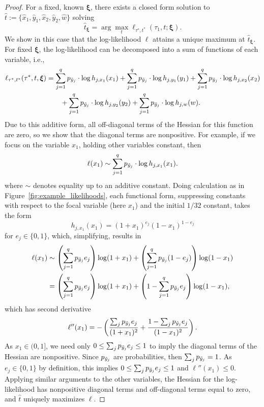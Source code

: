 \begin{proof}
For a fixed, known $\boldsymbol\xi$, there exists a closed form solution to $\hat{t} := \{\hat{x}_1,\hat{y}_1,\hat{x}_2,\hat{y}_2,\hat{w}\}$ solving
\[
\hat{t}_{\boldsymbol\xi} = \arg\max_t \ell_{\tau^*, t^*}(\tau_1, t; \boldsymbol\xi).
\]
We show in this case that the log-likelihood $\ell$ attains a unique maximum at $\hat{t}_{\boldsymbol\xi}$.
For fixed $\boldsymbol\xi$, the log-likelihood can be decomposed into a sum of functions of each variable, i.e.,
\begin{align*}
\ell_{\tau^*,t^*}(\tau^*, t, \boldsymbol\xi) &= \sum_{j=1}^q p_{\tilde{y}_j}\cdot\log h_{j,x_1}(x_1)+\sum_{j=1}^q p_{\tilde{y}_j}\cdot\log h_{j,y_1}(y_1)+\sum_{j=1}^q p_{\tilde{y}_j}\cdot\log h_{j,x_2}(x_2)\\
&\qquad + \sum_{j=1}^q p_{\tilde{y}_j}\cdot\log h_{j,y_2}(y_2)+\sum_{j=1}^q p_{\tilde{y}_j}\cdot\log h_{j,w}(w).
\end{align*}
Due to this additive form, all off-diagonal terms of the Hessian for this function are zero, so we show that the diagonal terms are nonpositive.
For example, if we focus on the variable $x_1$, holding other variables constant, then
\[
\ell(x_1) \sim \sum_{j=1}^q p_{\tilde{y}_j}\cdot\log h_{j,x_1}(x_1).
\]
where $\sim$ denotes equality up to an additive constant.
Doing calculation as in Figure~\ref{fig:example_likelihoods}, each functional form, suppressing constants with respect to the focal variable (here $x_1$) and the initial $1/32$ constant, takes the form
\[
h_{j,x_1}(x_1) = (1+x_1)^{e_j}(1-x_1)^{1-e_j}
\]
for $e_j\in\{0,1\}$, which, simplifying, results in
\begin{align}
\ell(x_1) &\sim \left(\sum_{j=1}^q p_{\tilde{y}_j}e_j\right) \log(1+x_1) + \left(\sum_{j=1}^q p_{\tilde{y}_j}(1-e_j)\right) \log (1-x_1)\\
                  &= \left(\sum_{j=1}^q p_{\tilde{y}_j}e_j\right) \log(1+x_1) + \left(1-\sum_{j=1}^q p_{\tilde{y}_j}e_j\right) \log (1-x_1), \label{eq:closed-form-x}
\end{align}
which has second derivative
\[
\ell''(x_1) = -\left(\frac{\sum_j p_{\tilde{y}_j}e_j}{(1+x_1)^2}+\frac{1-\sum_j p_{\tilde{y}_j}e_j}{(1-x_1)^2}\right).
\]
As $x_1\in(0,1]$, we need only $0 \le \sum_j p_{\tilde{y}_j}e_j \le 1$ to imply the diagonal terms of the Hessian are nonpositive.
Since $p_{\tilde{y}_j}$ are probabilities, then $\sum_j p_{\tilde{y}_j} = 1$.
As $e_j\in\{0,1\}$ by definition, this implies $0 \le \sum_j p_{\tilde{y}_j}e_j \le 1$ and $\ell''(x_1) \le 0$.
Applying similar arguments to the other variables, the Hessian for the log-likelihood has nonpositive diagonal terms and off-diagonal terms equal to zero, and $\hat{t}$ uniquely maximizes $\ell$.


\end{proof}
